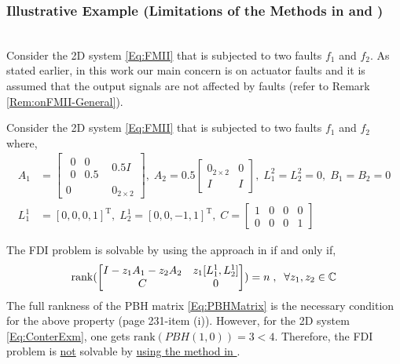 \documentclass[journal,12pt,draftcls,onecolumn]{IEEEtran}
\newcommand{\tran}{\mathrm{T}}
\newcommand{\bsm}{\begin{smallmatrix}}
\newcommand{\esm}{\end{smallmatrix}}
\newcommand{\bbm}{\begin{bmatrix}}
\newcommand{\ebm}{\end{bmatrix}}
\newcommand{\rank}{\mathrm{rank}}
\begin{document}
\subsubsection{Illustrative Example (Limitations of the Methods in \cite{BisiaccoMultiDim,BisiaccoLetter} and \cite{Malek_3DFDI})}\ \\
Consider the 2D system \eqref{Eq:FMII} that is subjected to two faults $f_1$ and $f_2$. As stated earlier, in this work our main concern is on actuator faults and it is assumed that the output signals are not affected by faults (refer to Remark \ref{Rem:onFMII-General}).


Consider the 2D system \eqref{Eq:FMII} that is subjected to two faults $f_1$ and $f_2$ where,
\begin{equation}\label{Eq:ConterExm}
	\begin{split}
		A_1 &= \bbm \bsm 0 &0\\ 0 &0.5\esm &0.5I\\ 0 &0_{2\times2}\ebm,\; A_2 = 0.5\bbm 0_{2\times 2} &0\\ I &I\ebm,\;L_1^2=L_2^2=0,\; B_1=B_2=0\\
		L_1^1 &= [0,0,0,1]^\tran,\;L_2^1 = [0,0,-1,1]^\tran,\; C=\bbm 1 &0 &0 &0\\ 0 &0 &0 &1\ebm
	\end{split}
\end{equation}

The FDI problem is solvable by using the approach in \cite{BisiaccoMultiDim} if and only if,
\begin{equation}
	\rank(\bbm I-z_1A_1-z_2A_2 &z_1[L^1_1,L^1_2]\\
	C	&0\ebm) = n\;,\;\;\forall z_1,z_2\in\fld{C}
\end{equation}
The full rankness of the PBH matrix \eqref{Eq:PBHMatrix} is the necessary condition for the above property \cite{BisiaccoMultiDim} (page 231-item (i)).
However, for the 2D system \eqref{Eq:ConterExm}, one gets $\rank(PBH(1,0))=3<4$. Therefore, the FDI problem is \underline{not} solvable by \underline{using the method in \cite{BisiaccoMultiDim}}.
\end{document}
